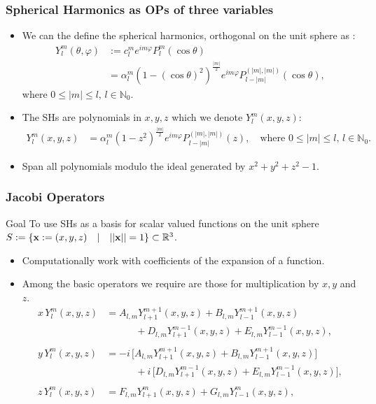 \documentclass[10pt]{beamer}
\newcommand{\R}{\mathbb{R}}
\newcommand{\No}{\mathbb{N}_0}
\newcommand{\Ylm}{Y^m_l}
\newcommand{\Ylmfull}{Y^m_l(\theta,\varphi)}
\newcommand{\Plm}{P^m_l}
\newcommand{\costheta}{\cos\theta}
\newcommand{\eimphi}{e^{im\varphi}}
\newcommand{\alphalm}{\alpha^m_l}
\newcommand{\clm}{c^m_l}
\newcommand{\Alm}{A_{l,m}}
\newcommand{\Blm}{B_{l,m}}
\newcommand{\Dlm}{D_{l,m}}
\newcommand{\Elm}{E_{l,m}}
\newcommand{\Flm}{F_{l,m}}
\newcommand{\Glm}{G_{l,m}}
\begin{document}
\frame
{
    \frametitle{Spherical Harmonics as OPs of three variables}

\begin{itemize}

\item We can the define the spherical harmonics, orthogonal on the unit sphere as \cite{DLMFSphericalandSpheroidalHarmonics, DLMFFerrers, DLMFAssociatedLegendre}:
\begin{align}
\Ylmfull &:= \clm \eimphi \Plm (\costheta) \nonumber \\
&= \alphalm (1 - (\costheta)^2)^\frac{|m|}{2} \eimphi P^{(|m|,|m|)}_{l-|m|}(\costheta), 
\end{align}
where  $0 \le |m| \le l, \, l \in \No$.

\item The SHs are polynomials in $x,y,z$ which we denote $\Ylm(x,y,z)$:
\begin{align}
\Ylm(x,y,z) &= \alphalm (1 - z^2)^\frac{|m|}{2} \eimphi P^{(|m|,|m|)}_{l-|m|}(z), \quad \text{where } 0 \le |m| \le l, \, l \in \No.
\end{align}

\item Span all polynomials modulo the ideal generated by $x^2 + y^2 + z^2 - 1$.

\end{itemize}

}

\frame
{
    \frametitle{Jacobi Operators}

\begin{block}{Goal}
To use SHs as a basis for scalar valued functions on the unit sphere $S := \{ \bold{x} := (x,y,z) \quad | \quad ||\bold{x}|| = 1\} \subset \R^3$.
\end{block} 

\begin{itemize}

\item Computationally work with coefficients of the expansion of a function.

\item Among the basic operators we require are those for multiplication by $x, y$ and $z$.
\begin{align}
x\,\Ylm(x,y,z) &= \Alm Y^{m+1}_{l+1}(x,y,z) +  \Blm Y^{m+1}_{l-1}(x,y,z) \nonumber \\
		     & \quad \quad \quad + \Dlm Y^{m-1}_{l+1}(x,y,z) + \Elm Y^{m-1}_{l-1}(x,y,z), \\ \nonumber \\
y\,\Ylm(x,y,z) &= - i \, \big[\Alm Y^{m+1}_{l+1}(x,y,z) +  \Blm Y^{m+1}_{l-1}(x,y,z) \big] \nonumber \\
		     &\quad \quad \quad + i \, \big[ \Dlm Y^{m-1}_{l+1}(x,y,z) + \Elm Y^{m-1}_{l-1}(x,y,z) \big], \\ \nonumber \\
z\,\Ylm(x,y,z) &= \Flm Y^{m}_{l+1}(x,y,z) + \Glm Y^{m}_{l-1}(x,y,z) ,
\end{align}

\end{itemize}

}
\end{document}
